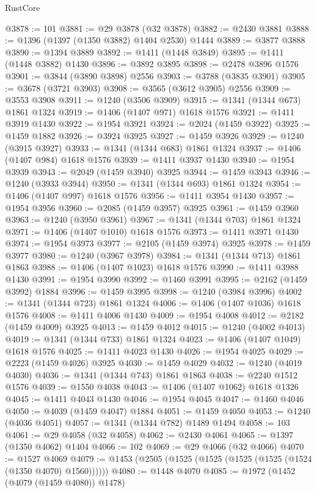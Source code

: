 \begin{lexlean}{RustCore}
\begin{coremodule}
@3878 := 101
@3881 := @29 @3878 (@32 @3878)
@3882 := @2430 @3881
@3888 := @1396 (@1397 (@1350 @3882) @1404 @2530) @1444
@3889 := @3877 @3888
@3890 := @1394 @3889
@3892 := @1411 (@1448 @3849)
@3895 := @1411 (@1448 @3882) @1430
@3896 := @3892 @3895
@3898 := @2478 @3896 @1576
@3901 := @3844 (@3890 @3898) @2556
@3903 := @3788 (@3835 @3901)
@3905 := @3678 (@3721 @3903)
@3908 := @3565 (@3612 @3905) @2556
@3909 := @3553 @3908
@3911 := @1240 (@3506 @3909)
@3915 := @1341 (@1344 @673) @1861 @1324
@3919 := @1406 (@1407 @971) @1618 @1576
@3921 := @1411 @3919 @1430
@3922 := @1954 @3921
@3924 := @2024 (@1459 @3922)
@3925 := @1459 @1882
@3926 := @3924 @3925
@3927 := @1459 @3926
@3929 := @1240 (@3915 @3927)
@3933 := @1341 (@1344 @683) @1861 @1324
@3937 := @1406 (@1407 @984) @1618 @1576
@3939 := @1411 @3937 @1430
@3940 := @1954 @3939
@3943 := @2049 (@1459 @3940) @3925
@3944 := @1459 @3943
@3946 := @1240 (@3933 @3944)
@3950 := @1341 (@1344 @693) @1861 @1324
@3954 := @1406 (@1407 @997) @1618 @1576
@3956 := @1411 @3954 @1430
@3957 := @1954 @3956
@3960 := @2085 (@1459 @3957) @3925
@3961 := @1459 @3960
@3963 := @1240 (@3950 @3961)
@3967 := @1341 (@1344 @703) @1861 @1324
@3971 := @1406 (@1407 @1010) @1618 @1576
@3973 := @1411 @3971 @1430
@3974 := @1954 @3973
@3977 := @2105 (@1459 @3974) @3925
@3978 := @1459 @3977
@3980 := @1240 (@3967 @3978)
@3984 := @1341 (@1344 @713) @1861 @1863
@3988 := @1406 (@1407 @1023) @1618 @1576
@3990 := @1411 @3988 @1430
@3991 := @1954 @3990
@3992 := @1460 @3991
@3995 := @2162 (@1459 @3992) @1884
@3996 := @1459 @3995
@3998 := @1240 (@3984 @3996)
@4002 := @1341 (@1344 @723) @1861 @1324
@4006 := @1406 (@1407 @1036) @1618 @1576
@4008 := @1411 @4006 @1430
@4009 := @1954 @4008
@4012 := @2182 (@1459 @4009) @3925
@4013 := @1459 @4012
@4015 := @1240 (@4002 @4013)
@4019 := @1341 (@1344 @733) @1861 @1324
@4023 := @1406 (@1407 @1049) @1618 @1576
@4025 := @1411 @4023 @1430
@4026 := @1954 @4025
@4029 := @2223 (@1459 @4026) @3925
@4030 := @1459 @4029
@4032 := @1240 (@4019 @4030)
@4036 := @1341 (@1344 @743) @1861 @1863
@4038 := @2240 @1512 @1576
@4039 := @1550 @4038
@4043 := @1406 (@1407 @1062) @1618 @1326
@4045 := @1411 @4043 @1430
@4046 := @1954 @4045
@4047 := @1460 @4046
@4050 := @4039 (@1459 @4047) @1884
@4051 := @1459 @4050
@4053 := @1240 (@4036 @4051)
@4057 := @1341 (@1344 @782) @1489 @1494
@4058 := 103
@4061 := @29 @4058 (@32 @4058)
@4062 := @2430 @4061
@4065 := @1397 (@1350 @4062) @1404
@4066 := 102
@4069 := @29 @4066 (@32 @4066)
@4070 := @1527 @4069
@4079 := @1453 (@2505 (@1525 (@1525 (@1525 (@1525 (@1524 (@1350 @4070) @1560))))))
@4080 := @1448 @4070
@4085 := @1972 (@1452 (@4079 (@1459 @4080)) @1478)

\end{coremodule}
\end{lexlean}
